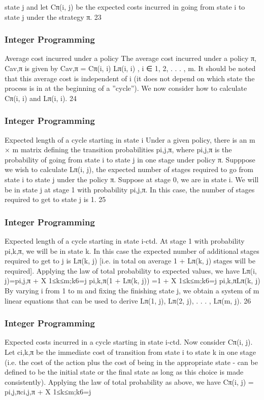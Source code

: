 \begin{frame}
state j and let Cπ(i, j) be the expected costs incurred in going
from state i to state j under the strategy π.
23 \end{frame}  \begin{frame} \frametitle{Integer Programming}     
Average cost incurred under a policy
The average cost incurred under a policy π, Cav,π is given by
Cav,π =
Cπ(i, i)
Lπ(i, i)
, i ∈ {1, 2, . . . , m}.
It should be noted that this average cost is independent of i (it
does not depend on which state the process is in at the beginning
of a ”cycle”).
We now consider how to calculate Cπ(i, i) and Lπ(i, i).
24 \end{frame}  \begin{frame} \frametitle{Integer Programming}     
Expected length of a cycle starting in state i
Under a given policy, there is an m × m matrix defining the
transition probabilities pi,j,π, where pi,j,π is the probability of going
from state i to state j in one stage under policy π.
Supppose we wish to calculate Lπ(i, j), the expected number of
stages required to go from state i to state j under the policy π.
Suppose at stage 0, we are in state i. We will be in state j at stage
1 with probability pi,j,π. In this case, the number of stages required
to get to state j is 1.
25 \end{frame}  \begin{frame} \frametitle{Integer Programming}     
Expected length of a cycle starting in state i-ctd.
At stage 1 with probability pi,k,π, we will be in state k. In this case
the expected number of additional stages required to get to j is
Lπ(k, j) [i.e. in total on average 1 + Lπ(k, j) stages will be
required].
Applying the law of total probability to expected values, we have
Lπ(i, j)=pi,j,π +
X
1≤k≤m;k6=j
pi,k,π(1 + Lπ(k, j))
=1 + X
1≤k≤m;k6=j
pi,k,πLπ(k, j)
By varying i from 1 to m and fixing the finishing state j, we obtain
a system of m linear equations that can be used to derive
Lπ(1, j), Lπ(2, j), . . . , Lπ(m, j).
26 \end{frame}  \begin{frame} \frametitle{Integer Programming}     
Expected costs incurred in a cycle starting in state i-ctd.
Now consider Cπ(i, j). Let ci,k,π be the immediate cost of
transition from state i to state k in one stage (i.e. the cost of the
action plus the cost of being in the appropriate state - can be
defined to be the initial state or the final state as long as this
choice is made consistently).
Applying the law of total probability as above, we have
Cπ(i, j) = pi,j,πci,j,π +
X
1≤k≤m;k6=j

\end{frame}
